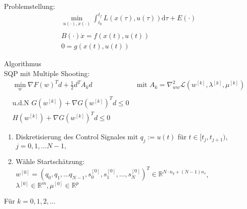 \documentclass[a4paper,oneside,DIV8,10pt]{scrartcl}
\newcounter{alg}
\newcommand{\R}{\ensuremath{\mathbb{R}}}   %
\newcommand{\hN}[1]{\ensuremath{^{[#1]}}}
\theoremstyle{definition}
\begin{document}

  
  

  
  Problemstellung:
  \begin{align*}
     \min_{u(\cdot), x(\cdot)} \int_{t_0}^{t_f} L(x(\tau), u(\tau)) \mathrm{d}\tau + E(\cdot)\\\\
     B(\cdot) \dot x = f(x(t), u(t)) \\
     0 = g(x(t), u(t))
  \end{align*}

  {Algorithmus} \\
  SQP mit Multiple Shooting: \\
  \begin{align}
      \min_{w} \nabla F(w)^T d + \frac{1}{2} d^T A_k d& \text{ mit } A_k = \nabla^2_{w w} \mathscr{L}(w\hN{k}, \lambda\hN{k}, \mu\hN{k})\label{gl:qp}\\\nonumber\\
      \text{u.d.N } G(w\hN{k})+ \nabla G(w\hN{k})^T d \leq 0 \nonumber& \\
      H(w\hN{k})+ \nabla G(w\hN{k})^T d \leq 0 \nonumber&
  \end{align}
  \begin{enumerate}[{(1)}]
    \item Diskretisierung des Control Signales mit $q_j := u(t)$ für $t \in [t_j, t_{j+1})$, $ j = 0, 1, \hdots N-1, $
    \item Wähle Startschätzung: $w^{[0]} = (q_0, q_1, \hdots q_{N-1}, s_0^{[0]}, s_1^{[0]}, \hdots, s_{N}^{[0]})^T \in \R^{N \cdot n_q + (N-1) n_s}$, $\lambda\hN{0} \in \R^m, \mu\hN{0} \in \R^p$
    \setcounter{alg}{\value{enumi}}
  \end{enumerate}
  Für $k = 0, 1, 2, \hdots $
\end{document}
